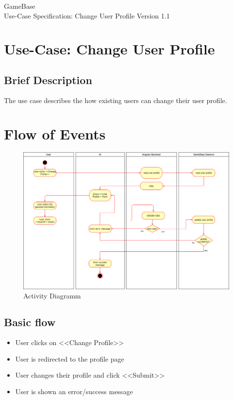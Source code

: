 \documentclass[a4paper,12pt,chapterprefix=false,bibliography=totoc,listof=totoc,book]{scrreprt}
\begin{document}
    \begin{flushright}
        GameBase
        \\
        Use-Case Specification: Change User Profile
        \bigbreak
        Version 1.1
    \end{flushright}

    \tableofcontents

    \chapter{Use-Case: Change User Profile}

    \section{Brief Description}
    The use case describes the how existing users can change their user profile.

    \chapter{Flow of Events}
    \begin{figure}[H]
        \includegraphics[width=\textwidth]{diagramms/UCChangeUserProfileDiagramm.png}
        \caption{Activity Diagramm}
        \label{fig:ucd}
    \end{figure}
    \section{Basic flow}

    \begin{itemize}
        \item User clicks on <<Change Profile>>
        \item User is redirected to the profile page
        \item User changes their profile and click <<Submit>>
        \item User is shown an error/success message
    \end{itemize}
\end{document}

